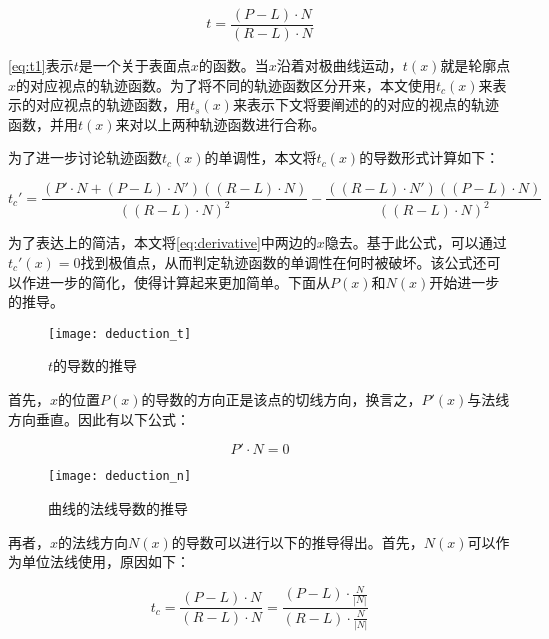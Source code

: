 \begin{equation}\label{eq:t1}
t = \frac{(P-L)\cdot{N}}{(R-L)\cdot{N}}
\end{equation}

\autoref{eq:t1}表示$t$是一个关于表面点$x$的函数。当$x$沿着对极曲线运动，$t(x)$就是轮廓点$x$的对应视点的轨迹函数。为了将不同的轨迹函数区分开来，本文使用$t_c(x)$来表示\conp{}的对应视点的轨迹函数，用$t_s(x)$来表示下文将要阐述的\sconp{}的对应的视点的轨迹函数，并用$t(x)$来对以上两种轨迹函数进行合称。

为了进一步讨论轨迹函数$t_c(x)$的单调性，本文将$t_c(x)$的导数形式计算如下：

\begin{equation}\label{eq:derivative}
  t_c' = \frac{(P'\cdot{N}+(P-L)\cdot{N'})((R-L)\cdot{N})}{((R-L)\cdot{N})^2}-\frac{((R-L)\cdot{N'})((P-L)\cdot{N})}{((R-L)\cdot{N})^2}
\end{equation}

为了表达上的简洁，本文将\autoref{eq:derivative}中两边的$x$隐去。基于此公式，可以通过$t_c'(x)=0$找到极值点，从而判定轨迹函数的单调性在何时被破坏。该公式还可以作进一步的简化，使得计算起来更加简单。下面从$P(x)$和$N(x)$开始进一步的推导。

\begin{figure}[bth]
    \centering
    \texttt{[image: deduction\_t]}
    \caption{\label{fig:deduction_t}
    $t$的导数的推导}
\end{figure}  

首先，$x$的位置$P(x)$的导数的方向正是该点的切线方向，换言之，$P'(x)$与法线方向垂直。因此有以下公式：

\begin{equation}\label{eq:perp}
    P'\cdot{N} = 0
\end{equation}

\begin{figure}[bth]
    \centering
    \texttt{[image: deduction\_n]}
    \caption{\label{fig:deduction_n}
    曲线的法线导数的推导}
\end{figure}

再者，$x$的法线方向$N(x)$的导数可以进行以下的推导得出。首先，$N(x)$可以作为单位法线使用，原因如下：

\begin{equation}
    t_c = \frac{(P-L)\cdot{N}}{(R-L)\cdot{N}} = \frac{(P-L)\cdot{\frac{N}{|N|}}}{(R-L)\cdot{\frac{N}{|N|}}}
\end{equation}

